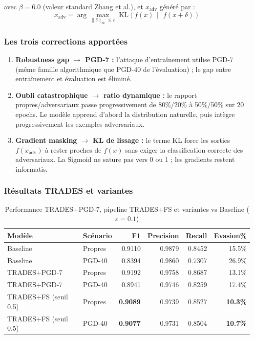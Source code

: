 \documentclass[11pt,a4paper]{article}
\begin{document}
avec $\beta = 6.0$ (valeur standard Zhang et al.), et $x_{\text{adv}}$ g\'en\'er\'e par :
\[
x_{\text{adv}} = \arg\max_{\|\delta\|_\infty \leq \varepsilon}\; \text{KL}\!\left(f(x) \,\|\, f(x+\delta)\right)
\]

\subsubsection*{Les trois corrections apport\'ees}

\begin{enumerate}[leftmargin=1.5em, noitemsep]
    \item \textbf{Robustness gap $\rightarrow$ PGD-7 :} l'attaque d'entra\^inement utilise PGD-7
    (m\^eme famille algorithmique que PGD-40 de l'\'evaluation) ; le gap entre entra\^inement et \'evaluation est \'elimin\'e.

    \item \textbf{Oubli catastrophique $\rightarrow$ ratio dynamique :}
    le rapport propres/adversariaux passe progressivement de 80\%/20\% \`a 50\%/50\% sur 20 epochs.
    Le mod\`ele apprend d'abord la distribution naturelle, puis int\`egre progressivement les exemples adversariaux.

    \item \textbf{Gradient masking $\rightarrow$ KL de lissage :}
    le terme KL force les sorties $f(x_{\text{adv}})$ \`a rester proches de $f(x)$ sans exiger
    la classification correcte des adversariaux. La Sigmoid ne sature pas vers 0 ou 1 ; les gradients restent informatis.
\end{enumerate}

\subsubsection*{R\'esultats TRADES et variantes}

\begin{table}[H]
\centering
\caption{Performance TRADES+PGD-7, pipeline TRADES+FS et variantes vs Baseline ($\varepsilon=0.1$)}
\begin{tabular}{llrrrr}
\toprule
\textbf{Mod\`ele} & \textbf{Sc\'enario} & \textbf{F1} & \textbf{Precision} & \textbf{Recall} & \textbf{Evasion\%} \\
\midrule
Baseline            & Propres & 0.9110 & 0.9879 & 0.8452 & 15.5\% \\
Baseline            & PGD-40  & 0.8394 & 0.9860 & 0.7307 & 26.9\% \\
\midrule
\rowcolor{inptblue!10}
TRADES+PGD-7        & Propres & 0.9192 & 0.9758 & 0.8687 & 13.1\% \\
\rowcolor{inptblue!18}
TRADES+PGD-7        & PGD-40  & 0.8941 & 0.9746 & 0.8259 & 17.4\% \\
\midrule
\rowcolor{inptblue!22}
TRADES+FS (seuil 0.5) & Propres & \textbf{0.9089} & 0.9739 & 0.8527 & \textbf{10.3\%} \\
\rowcolor{inptblue!32}
TRADES+FS (seuil 0.5) & PGD-40  & \textbf{0.9077} & 0.9731 & 0.8504 & \textbf{10.7\%} \\
\bottomrule
\end{tabular}
\end{table}
\end{document}
